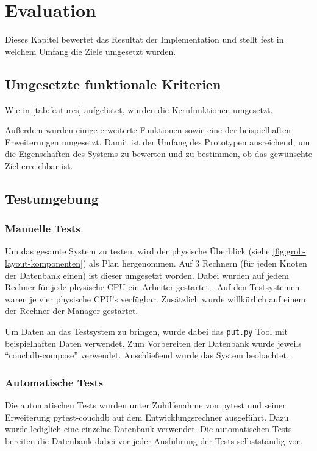 \chapter{Evaluation}
\label{cha:eval}
Dieses Kapitel bewertet das Resultat der Implementation und
stellt fest in welchem Umfang die Ziele umgesetzt wurden.

\section{Umgesetzte funktionale Kriterien}
\label{sec:eval:features}
Wie in \cref{tab:features} aufgelistet,
wurden die Kernfunktionen umgesetzt.

    

Außerdem wurden einige erweiterte Funktionen sowie eine der beispielhaften Erweiterungen umgesetzt.
Damit ist der Umfang des Prototypen ausreichend, um die Eigenschaften des Systems zu bewerten und zu bestimmen, ob das gewünschte Ziel erreichbar ist.


\section{Testumgebung}
\label{sec:eval:Testumgebung}

\subsection{Manuelle Tests}
Um das gesamte System zu testen, wird der physische Überblick (siehe \cref{fig:grob-layout-komponenten}) als Plan hergenommen.
Auf 3 Rechnern (für jeden Knoten der Datenbank einen) ist dieser umgesetzt worden.
Dabei wurden auf jedem Rechner für jede physische CPU ein Arbeiter gestartet .
Auf den Testsystemen waren je vier physische CPU's verfügbar.
Zusätzlich wurde willkürlich auf einem der Rechner der Manager gestartet.

Um Daten an das Testsystem zu bringen, wurde dabei das \verb|put.py| Tool mit beispielhaften Daten verwendet.
Zum Vorbereiten der Datenbank wurde jeweils ``couchdb-compose'' \cite{couchdb:compose} verwendet.
Anschließend wurde das System beobachtet.

\subsection{Automatische Tests}
Die automatischen Tests wurden unter Zuhilfenahme von pytest \cite{pytest:website} und seiner Erweiterung  pytest-couchdb \cite{pytest:couchdbkit} auf dem Entwicklungsrechner  ausgeführt.
Dazu wurde lediglich eine einzelne Datenbank verwendet.
Die automatischen Tests bereiten die Datenbank dabei vor jeder Ausführung der Tests selbstständig vor.

